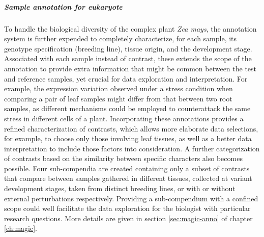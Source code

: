 \subparagraph{Sample annotation for eukaryote}
%
To handle the biological diversity of the complex plant \textit{Zea mays}, the
annotation system is further expended to completely characterize, for each
sample, its genotype specification (breeding line), tissue origin, and the
development stage.
%
Associated with each sample instead of contrast, these extends the scope of the 
annotation to provide extra information that might be common between 
the test and reference samples, yet crucial for data exploration and 
interpretation.
%
For example, the expression variation observed under a stress condition when 
comparing a pair of leaf samples might differ from that between two root 
samples, as different mechanisms could be employed to counterattack the same 
stress in different cells of a plant. 
%
Incorporating these annotations provides a refined characterization of 
contrasts, which allows more elaborate data selections, for example, to choose 
only those involving leaf tissues, as well as a better data interpretation to 
include those factors into consideration.
%
A further categorization of contrasts based on the similarity between specific 
characters also becomes possible.  Four sub-compendia are created containing 
only a subset of contrasts that compare between samples gathered in different 
tissues, collected at variant development stages, taken from distinct breeding 
lines, or with or without external perturbations respectively.
%
Providing a sub-compendium with a confined scope could well facilitate the data 
exploration for the biologist with particular research questions.
%
More details are given in section \ref{sec:magic-anno} of chapter 
\ref{ch:magic}.





